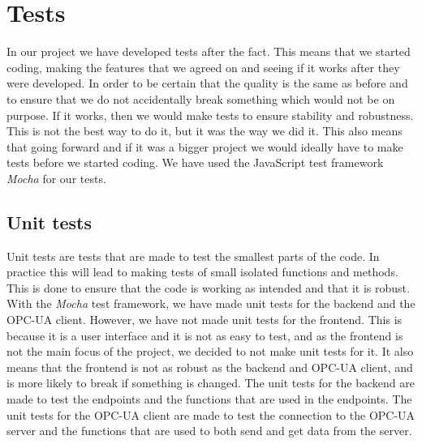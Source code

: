 \section{Tests}

In our project we have developed tests after the fact.
This means that we started coding, making the features that we agreed on
and seeing if it works after they were developed.
In order to be certain that the quality is the same as before
and to ensure that we do not accidentally break something which would not be on purpose.
If it works, then we would make tests to ensure stability and robustness.
This is not the best way to do it, but it was the way we did it.
This also means that going forward and if it was a bigger project
we would ideally have to make tests before we started coding.
We have used the JavaScript test framework \textit{Mocha} for our tests.

\subsection{Unit tests}

Unit tests are tests that are made to test the smallest parts of the code.
In practice this will lead to making tests of small isolated functions and methods.
This is done to ensure that the code is working as intended and that it is robust.
With the \textit{Mocha} test framework, we have made unit tests for the backend and the OPC-UA client.
However, we have not made unit tests for the frontend.
This is because it is a user interface and it is not as easy to test, and as the frontend is not the main focus of the project, we decided to not make unit tests for it.
It also means that the frontend is not as robust as the backend and OPC-UA client, and is more likely to break if something is changed.
The unit tests for the backend are made to test the endpoints and the functions that are used in the endpoints.
The unit tests for the OPC-UA client are made to test the connection to the OPC-UA server and the functions that are used to both send and get data from the server. \newline

